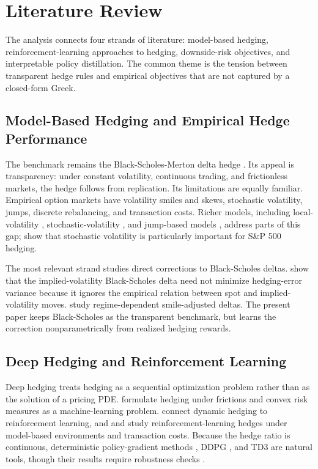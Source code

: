\documentclass[a4paper,12pt]{article}
\numberwithin{equation}{section}
\begin{document}
\section{Literature Review}

The analysis connects four strands of literature: model-based hedging, reinforcement-learning approaches to hedging, downside-risk objectives, and interpretable policy distillation. The common theme is the tension between transparent hedge rules and empirical objectives that are not captured by a closed-form Greek.

\subsection{Model-Based Hedging and Empirical Hedge Performance}

The benchmark remains the Black-Scholes-Merton delta hedge \citep{black1973pricing}. Its appeal is transparency: under constant volatility, continuous trading, and frictionless markets, the hedge follows from replication. Its limitations are equally familiar. Empirical option markets have volatility smiles and skews, stochastic volatility, jumps, discrete rebalancing, and transaction costs. Richer models, including local-volatility \citep{dupire1994pricing,derman1994riding}, stochastic-volatility \citep{heston1993closed}, and jump-based models \citep{naik1993option,tankov2009jump}, address parts of this gap; \citet{bakshi1997empirical} show that stochastic volatility is particularly important for S\&P 500 hedging.

The most relevant strand studies direct corrections to Black-Scholes deltas. \citet{hull2017optimal} show that the implied-volatility Black-Scholes delta need not minimize hedging-error variance because it ignores the empirical relation between spot and implied-volatility moves. \citet{alexander2012regime} study regime-dependent smile-adjusted deltas. The present paper keeps Black-Scholes as the transparent benchmark, but learns the correction nonparametrically from realized hedging rewards.

\subsection{Deep Hedging and Reinforcement Learning}

Deep hedging treats hedging as a sequential optimization problem rather than as the solution of a pricing PDE. \citet{buehler2019deep} formulate hedging under frictions and convex risk measures as a machine-learning problem. \citet{kolm2019dynamic} connect dynamic hedging to reinforcement learning, and \citet{cao2021deep} and \citet{giurca2021delta} study reinforcement-learning hedges under model-based environments and transaction costs. Because the hedge ratio is continuous, deterministic policy-gradient methods \citep{silver2014deterministic}, DDPG \citep{lillicrap2016continuous}, and TD3 \citep{fujimoto2018addressing} are natural tools, though their results require robustness checks \citep{henderson2018key}.
\end{document}
